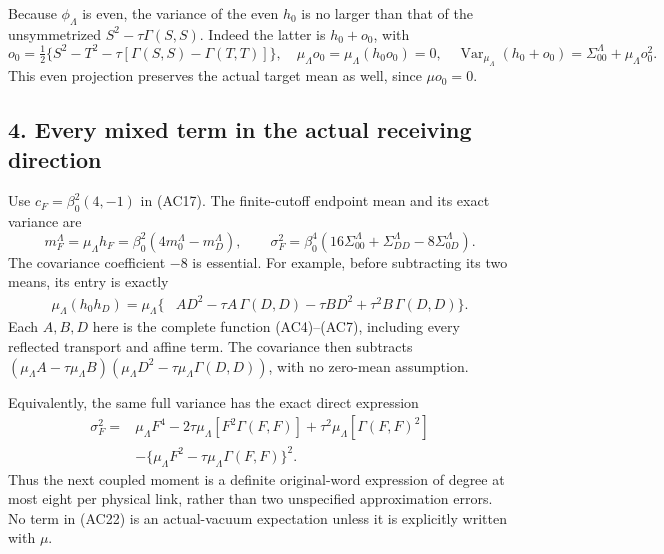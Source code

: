 \documentclass[11pt]{article}
\begin{document}
Because \(\phi_\Lambda\) is even, the variance of the even \(h_0\) is no larger than that of the unsymmetrized \(S^2-\tau\Gamma(S,S)\). Indeed the latter is \(h_0+o_0\), with
\[
 o_0=\tfrac12\{S^2-T^2-\tau[\Gamma(S,S)-\Gamma(T,T)]\},
 \quad
 \mu_\Lambda o_0=\mu_\Lambda(h_0o_0)=0,\quad
 \operatorname{Var}_{\mu_\Lambda}(h_0+o_0)
       =\Sigma_{00}^\Lambda+\mu_\Lambda o_0^2.
 \tag{AC19}
\]
This even projection preserves the actual target mean as well, since \(\mu o_0=0\).

\subsection*{4. Every mixed term in the actual receiving direction}

Use \(c_F=\beta_0^2(4,-1)\) in (AC17). The finite-cutoff endpoint mean and its exact variance are
\[
 m_F^\Lambda=\mu_\Lambda h_F
       =\beta_0^2(4m_0^\Lambda-m_D^\Lambda),\qquad
 \sigma_F^2=\beta_0^4
      (16\Sigma_{00}^\Lambda+\Sigma_{DD}^\Lambda-8\Sigma_{0D}^\Lambda).
 \tag{AC20}
\]
The covariance coefficient \(-8\) is essential. For example, before subtracting its two means, its entry is exactly
\[
 \begin{aligned}
 \mu_\Lambda(h_0h_D)
 =\mu_\Lambda\{&
 A D^2-\tau A\,\Gamma(D,D)-\tau B D^2
                  +\tau^2B\,\Gamma(D,D)\}.
 \end{aligned}\tag{AC21}
\]
Each \(A,B,D\) here is the complete function (AC4)–(AC7), including every reflected transport and affine term. The covariance then subtracts
\((\mu_\Lambda A-\tau\mu_\Lambda B)
 (\mu_\Lambda D^2-\tau\mu_\Lambda\Gamma(D,D))\), with no zero-mean assumption.

Equivalently, the same full variance has the exact direct expression
\[
 \begin{aligned}
 \sigma_F^2={}&
 \mu_\Lambda F^4-2\tau\mu_\Lambda[F^2\Gamma(F,F)]
           +\tau^2\mu_\Lambda[\Gamma(F,F)^2]\\
 &-\{\mu_\Lambda F^2-\tau\mu_\Lambda\Gamma(F,F)\}^2 .
 \end{aligned}\tag{AC22}
\]
Thus the next coupled moment is a definite original-word expression of degree at most eight per physical link, rather than two unspecified approximation errors. No term in (AC22) is an actual-vacuum expectation unless it is explicitly written with \(\mu\).
\end{document}

